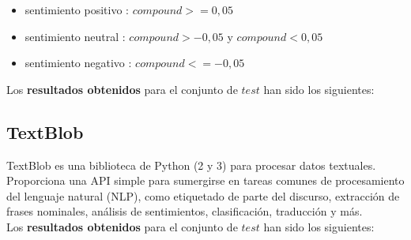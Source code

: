 \documentclass[a4paper,12pt]{report}
\begin{document}
\begin{itemize}
\item sentimiento positivo : $compound >= 0,05 $
\item sentimiento neutral : $compound > -0,05$ y $compound < 0,05$
\item sentimiento negativo : $compound <= -0,05$  
\end{itemize}

{\setlength{\parindent}{0cm}
Los \textbf{resultados obtenidos} para el conjunto de $test$ han sido los siguientes: }

\begin{table}[htbp!]
\centering
{}
\caption{Resultados para VaderSentiment}
\end{table}


\subsection{TextBlob}

{\setlength{\parindent}{0cm}
TextBlob es una biblioteca de Python (2 y 3) para procesar datos textuales. Proporciona una API simple para sumergirse en tareas comunes de procesamiento del lenguaje natural (NLP), como etiquetado de parte del discurso, extracción de frases nominales, análisis de sentimientos, clasificación, traducción y más.}
\vspace{2mm}\\
{\setlength{\parindent}{0cm}
Los \textbf{resultados obtenidos} para el conjunto de $test$ han sido los siguientes: }
\end{document}
